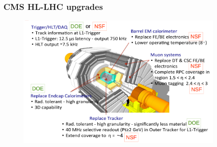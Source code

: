 \begin{frame}
\frametitle{CMS HL-LHC upgrades}

\begin{figure}[htbp]
\begin{center}
\includegraphics[width=0.9\textwidth]{images/hl-lhc-upgrade-cms-anders-ryd.png}
\end{center}
\end{figure}


\end{frame}



